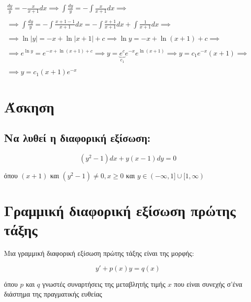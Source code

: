 \documentclass[12pt,a4paper]{article}
\begin{document}
\begin{gather*}
\frac{dy}{y}=-\frac{x}{x+1}dx \implies \int \frac{dy}{y}=-\int \frac{x}{x+1}dx \implies  \\ \\ \implies\int \frac{dy}{y}=-\int \frac{x+1-1}{x+1}dx =-\int \frac{x+1}{x+1}dx + \int\frac{1}{x+1}dx \implies  \\ \\ \implies \ln |y| =-x +\ln |x+1| + c \implies \ln y =-x +\ln(x+1) +c \implies \\ \\ \implies e^{\ln y}=e^{-x+ \ln(x+1)+c } \implies y=\underbrace{e^c}_{c_1}e^{-x}e^{\ln(x+1)} \implies y=c_1 e^{-x}(x+1) \implies \\ \\ \implies \boxed{y=c_1 (x+1)e^{-x}}
\end{gather*}

\vspace{1cm}

\section{Άσκηση}
\subsection{Να λυθεί η διαφορική εξίσωση:}

\begin{equation*}
\left(y^2 -1\right)dx + y(x-1)dy=0
\end{equation*}

όπου $(x+1)$ και $\left(y^2 -1 \right) \neq 0,  x \geqslant 0$ και $y\in(-\infty ,1]\cup [1,\infty)$

\vspace{30mm}

\section{Γραμμική διαφορική εξίσωση πρώτης τάξης}

Μια γραμμική διαφορική εξίσωση πρώτης τάξης είναι της μορφής: 

\begin{equation} \tag{1}
y' +p(x)y=q(x)
\end{equation}

όπου $p$ και $q$ γνωστές συναρτήσεις της μεταβλητής τιμής $x$ που είναι συνεχής σ'ένα διάστημα  της πραγματικής ευθείας\\
\end{document}

